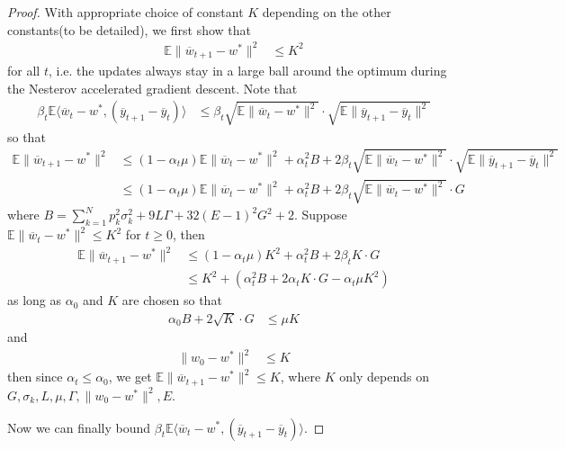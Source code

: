 \begin{proof}
	With appropriate choice of constant $K$ depending on the other constants(to
	be detailed), we first show that 
	\begin{align*}
	\mathbb{E}\|\overline{w}_{t+1}-w^{\ast}\|^{2} & \leq K^{2}
	\end{align*}
	for all $t$, i.e. the updates always stay in a large ball around
	the optimum during the Nesterov accelerated gradient descent. Note
	that
	\begin{align*}
	\beta_{t}\mathbb{E}\langle\overline{w}_{t}-w^{\ast},(\overline{y}_{t+1}-\overline{y}_{t})\rangle & \leq\beta_{t}\sqrt{\mathbb{E}\|\overline{w}_{t}-w^{\ast}\|^{2}}\cdot\sqrt{\mathbb{E}\|\overline{y}_{t+1}-\overline{y}_{t}\|^{2}}
	\end{align*}
	so that 
	\begin{align*}
	\mathbb{E}\|\overline{w}_{t+1}-w^{\ast}\|^{2} & \leq(1-\alpha_{t}\mu)\mathbb{E}\|\overline{w}_{t}-w^{\ast}\|^{2}+\alpha_{t}^{2}B+2\beta_{t}\sqrt{\mathbb{E}\|\overline{w}_{t}-w^{\ast}\|^{2}}\cdot\sqrt{\mathbb{E}\|\overline{y}_{t+1}-\overline{y}_{t}\|^{2}}\\
	& \leq(1-\alpha_{t}\mu)\mathbb{E}\|\overline{w}_{t}-w^{\ast}\|^{2}+\alpha_{t}^{2}B+2\beta_{t}\sqrt{\mathbb{E}\|\overline{w}_{t}-w^{\ast}\|^{2}}\cdot G
	\end{align*}
	where $B=\sum_{k=1}^{N}p_{k}^{2}\sigma_{k}^{2}+9L\Gamma+32(E-1)^{2}G^{2}+2$.
	Suppose $\mathbb{E}\|\overline{w}_{t}-w^{\ast}\|^{2}\leq K^{2}$ for
	$t\geq0$, then 
	\begin{align*}
	\mathbb{E}\|\overline{w}_{t+1}-w^{\ast}\|^{2} & \leq(1-\alpha_{t}\mu)K^{2}+\alpha_{t}^{2}B+2\beta_{t}K\cdot G\\
	& \leq K^{2}+(\alpha_{t}^{2}B+2\alpha_{t}K\cdot G-\alpha_{t}\mu K^{2})
	\end{align*}
	as long as $\alpha_{0}$ and $K$ are chosen so that 
	\begin{align*}
	\alpha_{0}B+2\sqrt{K}\cdot G & \leq\mu K
	\end{align*}
	and
	\begin{align*}
	\|w_{0}-w^{\ast}\|^{2} & \leq K
	\end{align*}
	then since $\alpha_{t}\leq\alpha_{0}$, we get $\mathbb{E}\|\overline{w}_{t+1}-w^{\ast}\|^{2}\leq K$,
	where $K$ only depends on $G,\sigma_{k},L,\mu,\Gamma,\|w_{0}-w^{\ast}\|^{2},E$. 
	
	Now we can finally bound $\beta_{t}\mathbb{E}\langle\overline{w}_{t}-w^{\ast},(\overline{y}_{t+1}-\overline{y}_{t})\rangle$.
	

\end{proof}
